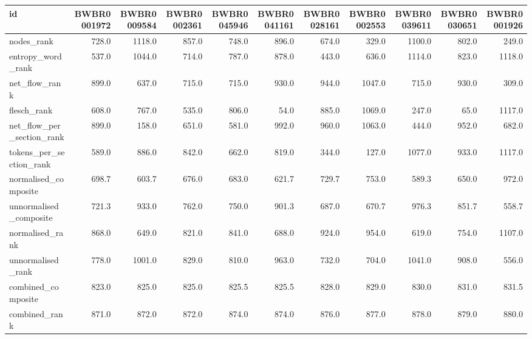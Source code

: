 \begin{tabular}{lrrrrrrrrrr}
\toprule
id & BWBR0001972 & BWBR0009584 & BWBR0002361 & BWBR0045946 & BWBR0041161 & BWBR0028161 & BWBR0002553 & BWBR0039611 & BWBR0030651 & BWBR0001926 \\
\midrule
nodes\_rank & 728.0 & 1118.0 & 857.0 & 748.0 & 896.0 & 674.0 & 329.0 & 1100.0 & 802.0 & 249.0 \\
\cline{1-11}
entropy\_word\_rank & 537.0 & 1044.0 & 714.0 & 787.0 & 878.0 & 443.0 & 636.0 & 1114.0 & 823.0 & 1118.0 \\
\cline{1-11}
net\_flow\_rank & 899.0 & 637.0 & 715.0 & 715.0 & 930.0 & 944.0 & 1047.0 & 715.0 & 930.0 & 309.0 \\
\cline{1-11}
flesch\_rank & 608.0 & 767.0 & 535.0 & 806.0 & 54.0 & 885.0 & 1069.0 & 247.0 & 65.0 & 1117.0 \\
\cline{1-11}
net\_flow\_per\_section\_rank & 899.0 & 158.0 & 651.0 & 581.0 & 992.0 & 960.0 & 1063.0 & 444.0 & 952.0 & 682.0 \\
\cline{1-11}
tokens\_per\_section\_rank & 589.0 & 886.0 & 842.0 & 662.0 & 819.0 & 344.0 & 127.0 & 1077.0 & 933.0 & 1117.0 \\
\cline{1-11}
normalised\_composite & 698.7 & 603.7 & 676.0 & 683.0 & 621.7 & 729.7 & 753.0 & 589.3 & 650.0 & 972.0 \\
\cline{1-11}
unnormalised\_composite & 721.3 & 933.0 & 762.0 & 750.0 & 901.3 & 687.0 & 670.7 & 976.3 & 851.7 & 558.7 \\
\cline{1-11}
normalised\_rank & 868.0 & 649.0 & 821.0 & 841.0 & 688.0 & 924.0 & 954.0 & 619.0 & 754.0 & 1107.0 \\
\cline{1-11}
unnormalised\_rank & 778.0 & 1001.0 & 829.0 & 810.0 & 963.0 & 732.0 & 704.0 & 1041.0 & 908.0 & 556.0 \\
\cline{1-11}
combined\_composite & 823.0 & 825.0 & 825.0 & 825.5 & 825.5 & 828.0 & 829.0 & 830.0 & 831.0 & 831.5 \\
\cline{1-11}
combined\_rank & 871.0 & 872.0 & 872.0 & 874.0 & 874.0 & 876.0 & 877.0 & 878.0 & 879.0 & 880.0 \\
\cline{1-11}
\bottomrule
\end{tabular}
